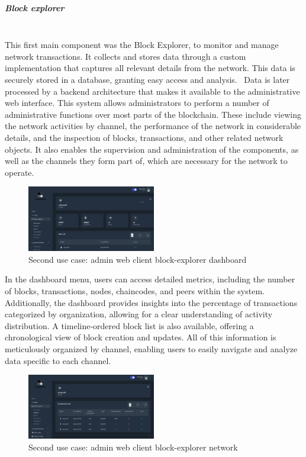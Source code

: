 \subparagraph{Block explorer}\mbox{}\\
This first main component was the Block Explorer, to monitor and manage network transactions. It collects and stores data through a custom implementation that captures all relevant details from the network. This data is securely stored in a database, granting easy access and analysis. 
Data is later processed by a backend architecture that makes it available to the administrative web interface.
This system allows administrators to perform a number of administrative functions over most parts of the blockchain. These include viewing the network activities by channel, the performance of the network in considerable details, and the inspection of blocks, transactions, and other related network objects. It also enables the supervision and administration of the components, as well as the channels they form part of, which are necessary for the network to operate.

\begin{figure}[H]
    \centering
    \includegraphics[width=0.5\textwidth]{assets/use-case-2/block-explorer-dashboard.png} %
    \caption{Second use case: admin web client block-explorer dashboard}
    \label{fig:sample-image} 
\end{figure}

In the dashboard menu, users can access detailed metrics, including the number of blocks, transactions, nodes, chaincodes, and peers within the system. Additionally, the dashboard provides insights into the percentage of transactions categorized by organization, allowing for a clear understanding of activity distribution. A timeline-ordered block list is also available, offering a chronological view of block creation and updates. All of this information is meticulously organized by channel, enabling users to easily navigate and analyze data specific to each channel.

\begin{figure}[H]
    \centering
    \includegraphics[width=0.5\textwidth]{assets/use-case-2/block-explorer-network.png} %
    \caption{Second use case: admin web client block-explorer network}
    \label{fig:sample-image} 
\end{figure}

